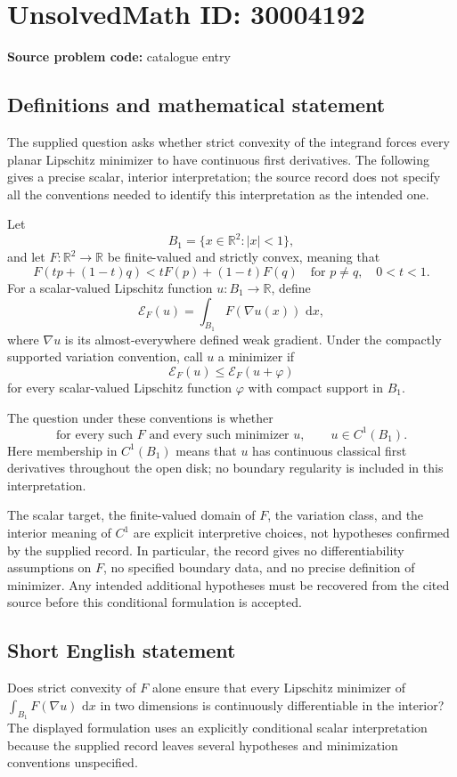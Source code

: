 \documentclass[11pt]{article}
\newcommand{\R}{\mathbb{R}}
\newcommand{\dd}{\,\mathrm{d}}
\begin{document}
\section*{UnsolvedMath ID: 30004192}
\textbf{Source problem code:} catalogue entry
\subsection{Definitions and mathematical statement}
The supplied question asks whether strict convexity of the integrand forces every planar Lipschitz minimizer to have continuous first derivatives. The following gives a precise scalar, interior interpretation; the source record does not specify all the conventions needed to identify this interpretation as the intended one.

Let
\[
B_1=\{x\in\R^2:|x|<1\},
\]
and let \(F:\R^2\to\R\) be finite-valued and strictly convex, meaning that
\[
F(tp+(1-t)q)<tF(p)+(1-t)F(q)
\quad\text{for }p\ne q,\quad 0<t<1.
\]
For a scalar-valued Lipschitz function \(u:B_1\to\R\), define
\[
\mathcal E_F(u)=\int_{B_1}F(\nabla u(x))\,\dd x,
\]
where \(\nabla u\) is its almost-everywhere defined weak gradient. Under the compactly supported variation convention, call \(u\) a minimizer if
\[
\mathcal E_F(u)\leq\mathcal E_F(u+\varphi)
\]
for every scalar-valued Lipschitz function \(\varphi\) with compact support in \(B_1\).

The question under these conventions is whether
\[
\text{for every such }F\text{ and every such minimizer }u,
\qquad u\in C^1(B_1).
\]
Here membership in \(C^1(B_1)\) means that \(u\) has continuous classical first derivatives throughout the open disk; no boundary regularity is included in this interpretation.

The scalar target, the finite-valued domain of \(F\), the variation class, and the interior meaning of \(C^1\) are explicit interpretive choices, not hypotheses confirmed by the supplied record. In particular, the record gives no differentiability assumptions on \(F\), no specified boundary data, and no precise definition of minimizer. Any intended additional hypotheses must be recovered from the cited source before this conditional formulation is accepted.
\subsection{Short English statement}
Does strict convexity of \(F\) alone ensure that every Lipschitz minimizer of \(\int_{B_1}F(\nabla u)\,\dd x\) in two dimensions is continuously differentiable in the interior? The displayed formulation uses an explicitly conditional scalar interpretation because the supplied record leaves several hypotheses and minimization conventions unspecified.
\end{document}
